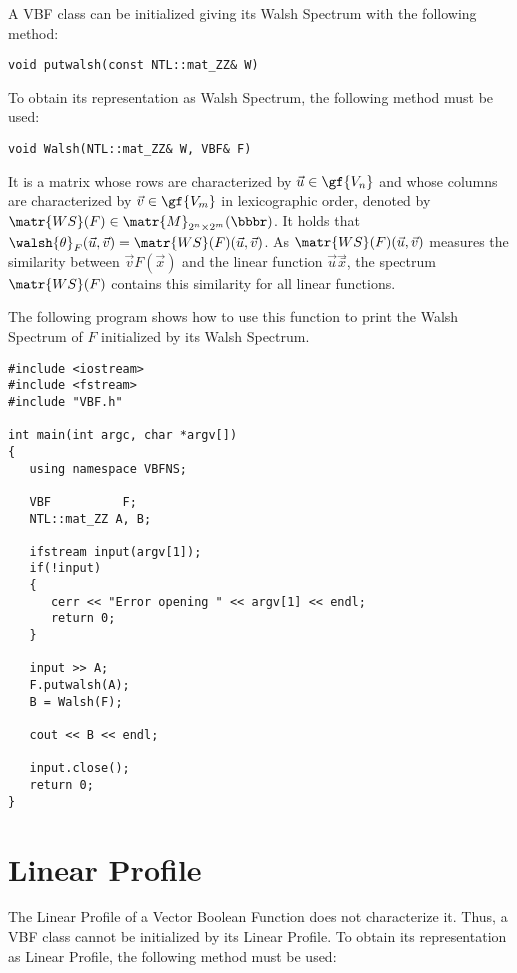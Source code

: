 A VBF class can be initialized giving its Walsh Spectrum with the following method:

\begin{verbatim}
void putwalsh(const NTL::mat_ZZ& W)
\end{verbatim}

To obtain its representation as Walsh Spectrum, the following method must be used:

\begin{verbatim}
void Walsh(NTL::mat_ZZ& W, VBF& F)
\end{verbatim}

It is a matrix whose rows are characterized by $\vec{u} \in \gf{V_n}$ and whose columns are characterized by $\vec{v} \in \gf{V_m}$ in lexicographic order, denoted by $\matr{WS}(F) \in \matr{M}_{2^n \times 2^m}(\bbbr)$. It holds that $\walsh{\theta}_F(\vec{u},\vec{v}) = \matr{WS}(F)(\vec{u},\vec{v})$.  As $\matr{WS}(F)(\vec{u},\vec{v})$ measures the similarity between  $\vec{v} F(\vec{x})$ and the linear function $\vec{u}\vec{x}$̄, the spectrum $\matr{WS}(F)$ contains this similarity for all linear functions.

The following program shows how to use this function to print the Walsh Spectrum of $F$ initialized by its Walsh Spectrum.

\begin{verbatim}
#include <iostream>
#include <fstream>
#include "VBF.h"

int main(int argc, char *argv[])
{
   using namespace VBFNS;

   VBF          F;
   NTL::mat_ZZ A, B;

   ifstream input(argv[1]);
   if(!input)
   {
      cerr << "Error opening " << argv[1] << endl;
      return 0;
   }

   input >> A;
   F.putwalsh(A);
   B = Walsh(F);

   cout << B << endl;

   input.close();
   return 0;
}
\end{verbatim}

\section{Linear Profile}

The Linear Profile of a Vector Boolean Function does not characterize it. Thus, a VBF class cannot be initialized by its Linear Profile. To obtain its representation as Linear Profile, the following method must be used:

